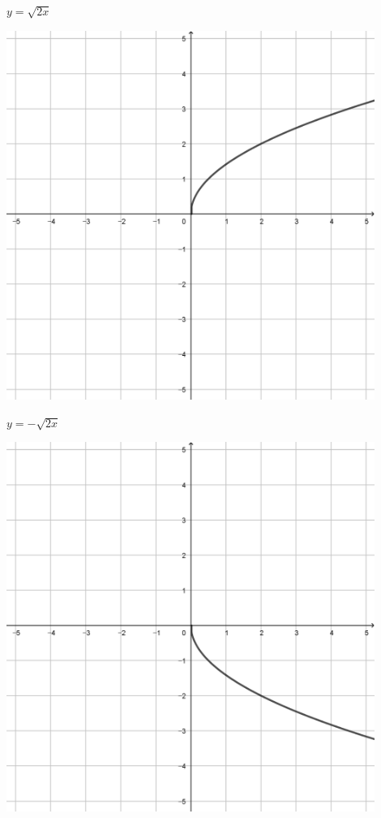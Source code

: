 \documentclass[a4paper]{oblivoir}
\begin{document}
\begin{minipage}{0.45\textwidth}\centering
\(y=\sqrt{2x}\)
\par\bigskip\includegraphics[width=0.9\textwidth]{img/5_irrational_5}
\end{minipage}
\begin{minipage}{0.45\textwidth}\centering
\(y=-\sqrt{2x}\)
\par\bigskip\includegraphics[width=0.9\textwidth]{img/5_irrational_6}
\end{minipage}\bigskip\bigskip\par
\end{document}
